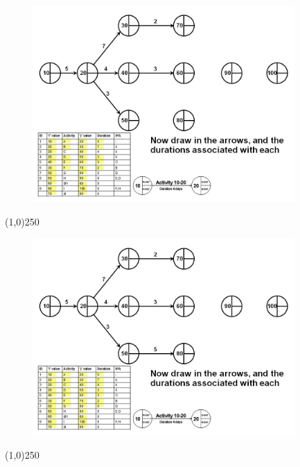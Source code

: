 \begin{frame}
\begin{figure}
	\centering
		\includegraphics[width = 10.0cm]{oldnotes/Slide96.jpg}
\end{figure}
\end{frame}
\begin{center}\line(1,0){250}\end{center}


\begin{frame}
\begin{figure}
	\centering
		\includegraphics[width = 10.0cm]{oldnotes/Slide97.jpg}
\end{figure}
\end{frame}
\begin{center}\line(1,0){250}\end{center}


